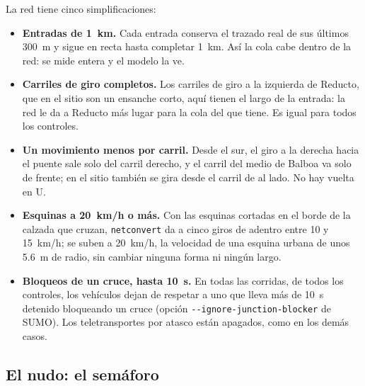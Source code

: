 La red tiene cinco simplificaciones:
\begin{itemize}
  \item \textbf{Entradas de 1~km.} Cada entrada conserva el trazado real
    de sus últimos 300~m y sigue en recta hasta completar 1~km. Así la
    cola cabe dentro de la red: se mide entera y el modelo la ve.
  \item \textbf{Carriles de giro completos.} Los carriles de giro a la
    izquierda de Reducto, que en el sitio son un ensanche corto, aquí
    tienen el largo de la entrada: la red le da a Reducto más lugar para
    la cola del que tiene. Es igual para todos los controles.
  \item \textbf{Un movimiento menos por carril.} Desde el sur, el giro a
    la derecha hacia el puente sale solo del carril derecho, y el carril
    del medio de Balboa va solo de frente; en el sitio también se gira
    desde el carril de al lado. No hay vuelta en U.
  \item \textbf{Esquinas a 20~km/h o más.} Con las esquinas cortadas en
    el borde de la calzada que cruzan, \texttt{netconvert} da a cinco
    giros de adentro entre 10 y 15~km/h; se suben a 20~km/h, la
    velocidad de una esquina urbana de unos 5.6~m de radio, sin cambiar
    ninguna forma ni ningún largo.
  \item \textbf{Bloqueos de un cruce, hasta 10~s.} En todas las
    corridas, de todos los controles, los vehículos dejan de respetar a
    uno que lleva más de 10~s detenido bloqueando un cruce (opción
    \texttt{-{}-ignore-junction-blocker} de SUMO). Los teletransportes
    por atasco están apagados, como en los demás casos.
\end{itemize}

\subsection*{El nudo: el semáforo}

